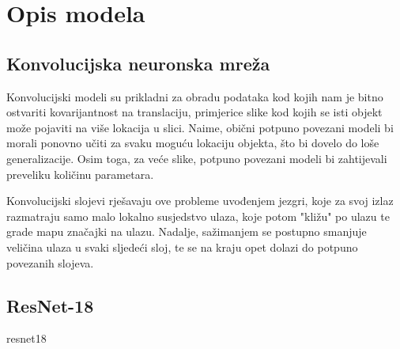 \chapter{Opis modela}

\section{Konvolucijska neuronska mreža}

Konvolucijski modeli su prikladni za obradu podataka kod kojih nam je bitno ostvariti kovarijantnost na translaciju, primjerice slike kod kojih se isti objekt može pojaviti na više lokacija u slici. Naime, obični potpuno povezani modeli bi morali ponovno učiti za svaku moguću lokaciju objekta, što bi dovelo do loše generalizacije. Osim toga, za veće slike, potpuno povezani modeli bi zahtijevali preveliku količinu parametara.

Konvolucijski slojevi rješavaju ove probleme uvođenjem jezgri, koje za svoj izlaz razmatraju samo malo lokalno susjedstvo ulaza, koje potom "kližu" po ulazu te grade mapu značajki na ulazu. Nadalje, sažimanjem se postupno smanjuje veličina ulaza u svaki sljedeći sloj, te se na kraju opet dolazi do potpuno povezanih slojeva.

\section{ResNet-18}

resnet18